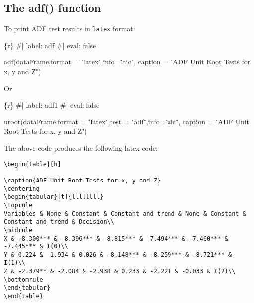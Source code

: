 \documentclass[
  letterpaper,
  DIV=11,
  numbers=noendperiod]{scrartcl}
\newenvironment{Shaded}{\begin{snugshade}}{\end{snugshade}}
\newcommand{\AttributeTok}[1]{\textcolor[rgb]{0.40,0.45,0.13}{#1}}
\newcommand{\CommentTok}[1]{\textcolor[rgb]{0.37,0.37,0.37}{#1}}
\newcommand{\FunctionTok}[1]{\textcolor[rgb]{0.28,0.35,0.67}{#1}}
\newcommand{\InformationTok}[1]{\textcolor[rgb]{0.37,0.37,0.37}{#1}}
\newcommand{\NormalTok}[1]{\textcolor[rgb]{0.00,0.23,0.31}{#1}}
\newcommand{\StringTok}[1]{\textcolor[rgb]{0.13,0.47,0.30}{#1}}
\begin{document}
\hypertarget{the-adf-function}{%
\subsection{The adf() function}\label{the-adf-function}}

To print ADF test results in \texttt{latex} format:

\begin{Shaded}
\begin{Highlighting}[]
\InformationTok{\textasciigrave{}\textasciigrave{}\textasciigrave{}\{r\}}
\CommentTok{\#| label: adf}
\CommentTok{\#| eval: false}

\FunctionTok{adf}\NormalTok{(dataFrame,}\AttributeTok{format =} \StringTok{"latex"}\NormalTok{,}\AttributeTok{info=}\StringTok{"aic"}\NormalTok{,}
    \AttributeTok{caption =} \StringTok{"ADF Unit Root Tests for x, y and Z"}\NormalTok{) }
\InformationTok{\textasciigrave{}\textasciigrave{}\textasciigrave{}}
\end{Highlighting}
\end{Shaded}

Or

\begin{Shaded}
\begin{Highlighting}[]
\InformationTok{\textasciigrave{}\textasciigrave{}\textasciigrave{}\{r\}}
\CommentTok{\#| label: adf1}
\CommentTok{\#| eval: false}

\FunctionTok{uroot}\NormalTok{(dataFrame,}\AttributeTok{format =} \StringTok{"latex"}\NormalTok{,}\AttributeTok{test =} \StringTok{"adf"}\NormalTok{,}\AttributeTok{info=}\StringTok{"aic"}\NormalTok{,}
      \AttributeTok{caption =} \StringTok{"ADF Unit Root Tests for x, y and Z"}\NormalTok{)}
\InformationTok{\textasciigrave{}\textasciigrave{}\textasciigrave{}}
\end{Highlighting}
\end{Shaded}

The above code produces the following latex code:

\begin{verbatim}
\begin{table}[h]

\caption{ADF Unit Root Tests for x, y and Z}
\centering
\begin{tabular}[t]{llllllll}
\toprule
Variables & None & Constant & Constant and trend & None & Constant & Constant and trend & Decision\\
\midrule
X & -8.300*** & -8.396*** & -8.815*** & -7.494*** & -7.460*** & -7.445*** & I(0)\\
Y & 0.224 & -1.934 & 0.026 & -8.148*** & -8.259*** & -8.721*** & I(1)\\
Z & -2.379** & -2.084 & -2.938 & 0.233 & -2.221 & -0.033 & I(2)\\
\bottomrule
\end{tabular}
\end{table}
\end{verbatim}
\end{document}

